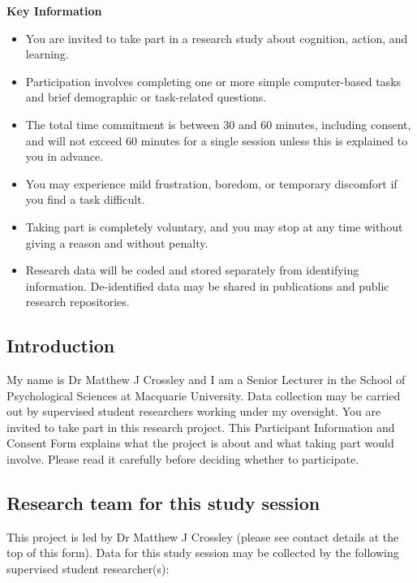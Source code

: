\documentclass[letterpaper, 10pt]{article}
\let\oldsubsection\subsection
\renewcommand{\subsection}[1]{%
  \Needspace{10\baselineskip}%
  \oldsubsection{#1}%
}
\begin{document}
\begin{panelbox}
\textbf{\color{Red}Key Information}
\begin{itemize}[leftmargin=*]
\item You are invited to take part in a research study about
    cognition, action, and learning.

\item Participation involves completing one or more simple
    computer-based tasks and brief demographic or
    task-related questions.

\item The total time commitment is between 30 and 60
    minutes, including consent, and will not exceed 60
    minutes for a single session unless this is explained to
    you in advance.

\item You may experience mild frustration, boredom, or
    temporary discomfort if you find a task difficult.

\item Taking part is completely voluntary, and you may stop
    at any time without giving a reason and without penalty.

\item Research data will be coded and stored separately from
    identifying information. De-identified data may be
    shared in publications and public research repositories.
\end{itemize}
\end{panelbox}

\newpage

\subsection{Introduction}
My name is Dr Matthew J Crossley and I am a Senior Lecturer
in the School of Psychological Sciences at Macquarie
University. Data collection may be carried out by supervised
student researchers working under my oversight.  You are
invited to take part in this research project. This
Participant Information and Consent Form explains what the
project is about and what taking part would involve. Please
read it carefully before deciding whether to participate.

\subsection{Research team for this study session}
This project is led by Dr Matthew J Crossley (please see
contact details at the top of this form). Data for this
study session may be collected by the following supervised
student researcher(s):
\end{document}
